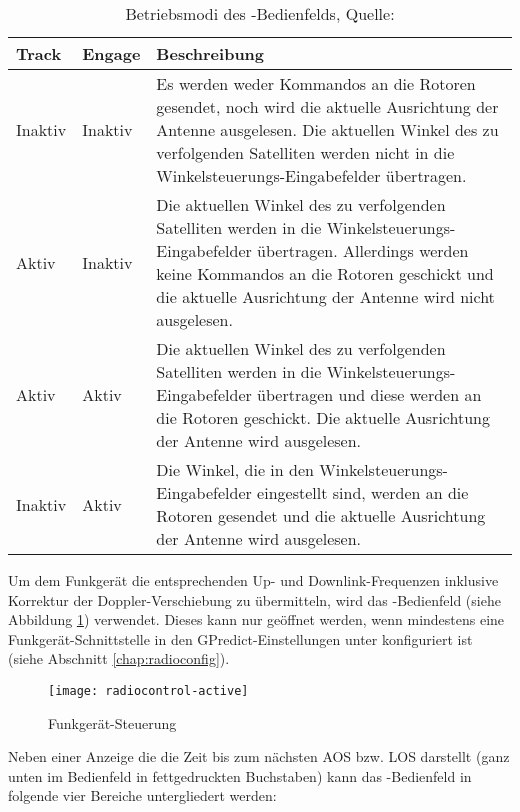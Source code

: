 \begin{table}[h]
	\caption[Betriebsmodi des -Bedienfelds]{Betriebsmodi des -Bedienfelds, Quelle: \cite{gpredictmanual}\vspace{-0.5em}}
	\begin{tabularx}{\textwidth}{|l|l|X|}
		\hline
		\textbf{Track} 	    & \textbf{Engage}	&\textbf{Beschreibung}\\
		\hline
		Inaktiv          	& Inaktiv 			& Es werden weder Kommandos an die Rotoren gesendet, noch wird die aktuelle Ausrichtung der Antenne ausgelesen. Die aktuellen Winkel des zu verfolgenden Satelliten werden nicht in die Winkelsteuerungs-Eingabefelder übertragen.\\
		Aktiv              	& Inaktiv   		& Die aktuellen Winkel des zu verfolgenden Satelliten werden in die Winkelsteuerungs-Eingabefelder übertragen. Allerdings werden keine Kommandos an die Rotoren geschickt und die aktuelle Ausrichtung der Antenne wird nicht ausgelesen.\\
		Aktiv              	& Aktiv	            & Die aktuellen Winkel des zu verfolgenden Satelliten werden in die Winkelsteuerungs-Eingabefelder übertragen und diese werden an die Rotoren geschickt. Die aktuelle Ausrichtung der Antenne wird ausgelesen.\\
		Inaktiv            	& Aktiv   			& Die Winkel, die in den Winkelsteuerungs-Eingabefelder eingestellt sind, werden an die Rotoren gesendet und die aktuelle Ausrichtung der Antenne wird ausgelesen.\\
		\hline		
	\end{tabularx}
	\label{tab:rotatorcontrolmodes}
\end{table}

\newpage

Um dem Funkgerät die entsprechenden Up- und Downlink-Frequenzen inklusive Korrektur der Doppler-Verschiebung zu übermitteln, wird das -Bedienfeld (siehe Abbildung \ref{fig:radiocontrol}) verwendet. Dieses kann nur geöffnet werden, wenn mindestens eine Funkgerät-Schnittstelle in den GPredict-Einstellungen unter  konfiguriert ist (siehe Abschnitt \ref{chap:radioconfig}).

\begin{figure}[h]
	\centering
	\texttt{[image: radiocontrol-active]}
	\caption{Funkgerät-Steuerung}
	\label{fig:radiocontrol} 
\end{figure}

Neben einer Anzeige die die Zeit bis zum nächsten \ac{AOS} bzw. \ac{LOS} darstellt (ganz unten im Bedienfeld in fettgedruckten Buchstaben) kann das -Bedienfeld in folgende vier Bereiche untergliedert werden:

